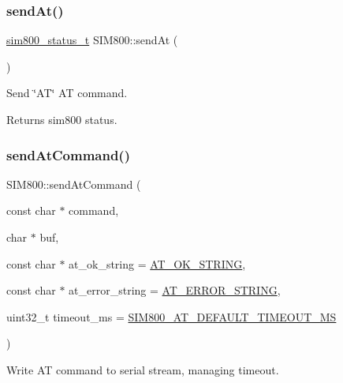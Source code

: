 \subsubsection{\texorpdfstring{send\+At()}{sendAt()}}
{\footnotesize\ttfamily \hyperlink{sim800_8h_a3d1eeaa095df003ea28385b81a134b27}{sim800\+\_\+status\+\_\+t} S\+I\+M800\+::send\+At (\begin{DoxyParamCaption}{ }\end{DoxyParamCaption})}



Send \char`\"{}\+A\+T\char`\"{} AT command. 

\begin{DoxyReturn}{Returns}
sim800 status. 
\end{DoxyReturn}
\mbox{\label{classSIM800_a3ff02a2d318c230bc3711af6316a28c3}} 
\subsubsection{\texorpdfstring{send\+At\+Command()}{sendAtCommand()}}
{\footnotesize\ttfamily S\+I\+M800\+::send\+At\+Command (\begin{DoxyParamCaption}\item[{const char $\ast$}]{command,  }\item[{char $\ast$}]{buf,  }\item[{const char $\ast$}]{at\+\_\+ok\+\_\+string = {\ttfamily \hyperlink{sim800_8h_a1da24009e90c1a5de1d1f0bc0dda6dc6}{A\+T\+\_\+\+O\+K\+\_\+\+S\+T\+R\+I\+NG}},  }\item[{const char $\ast$}]{at\+\_\+error\+\_\+string = {\ttfamily \hyperlink{sim800_8h_a883ea39010a33ca1b400940a65869e47}{A\+T\+\_\+\+E\+R\+R\+O\+R\+\_\+\+S\+T\+R\+I\+NG}},  }\item[{uint32\+\_\+t}]{timeout\+\_\+ms = {\ttfamily \hyperlink{sim800_8h_a0499ea42358376e7a0c09e540ab7219a}{S\+I\+M800\+\_\+\+A\+T\+\_\+\+D\+E\+F\+A\+U\+L\+T\+\_\+\+T\+I\+M\+E\+O\+U\+T\+\_\+\+MS}} }\end{DoxyParamCaption})}



Write AT command to serial stream, managing timeout. 


